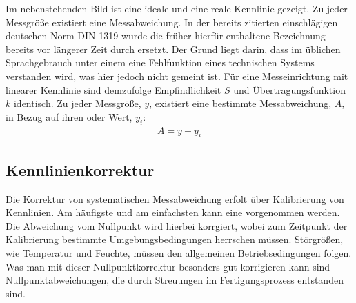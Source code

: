 \documentclass[letterpaper,10pt,english]{jupyterBook}
\begin{document}
\sphinxAtStartPar
Im nebenstehenden Bild ist eine ideale und eine reale Kennlinie gezeigt. Zu jeder Messgröße existiert eine Messabweichung.
In der bereits zitierten einschlägigen deutschen Norm DIN 1319 wurde die früher hierfür enthaltene Bezeichnung  bereits vor längerer Zeit durch  ersetzt. Der Grund liegt darin, dass im üblichen Sprachgebrauch unter einem  eine Fehlfunktion eines technischen Systems verstanden wird, was hier jedoch nicht gemeint ist.
Für eine Messeinrichtung mit linearer Kennlinie sind demzufolge Empfindlichkeit \(S\) und Übertragungsfunktion \(k\) identisch.
Zu jeder Messgröße, \(y\), existiert eine bestimmte Messabweichung, \(A\), in Bezug auf ihren  oder  Wert, \(y_i\):
\begin{equation*}
\begin{split}A = y - y_i\end{split}
\end{equation*}
\sphinxAtStartPar
{}


\subsection{Kennlinienkorrektur}
\label{\detokenize{content/2_realeKennlinie:kennlinienkorrektur}}
\sphinxAtStartPar


\sphinxAtStartPar
Die Korrektur von systematischen Messabweichung erfolt über Kalibrierung von Kennlinien. Am häufigste und am einfachsten kann eine  vorgenommen werden. Die Abweichung vom Nullpunkt wird hierbei korrgiert, wobei zum Zeitpunkt der Kalibrierung bestimmte Umgebungsbedingungen herrschen müssen. Störgrößen, wie Temperatur und Feuchte, müssen den allgemeinen Betriebsedingungen folgen. Was man mit dieser Nullpunktkorrektur besonders gut korrigieren kann sind Nullpunktabweichungen, die durch Streuungen im Fertigungsprozess entstanden sind.
\end{document}
